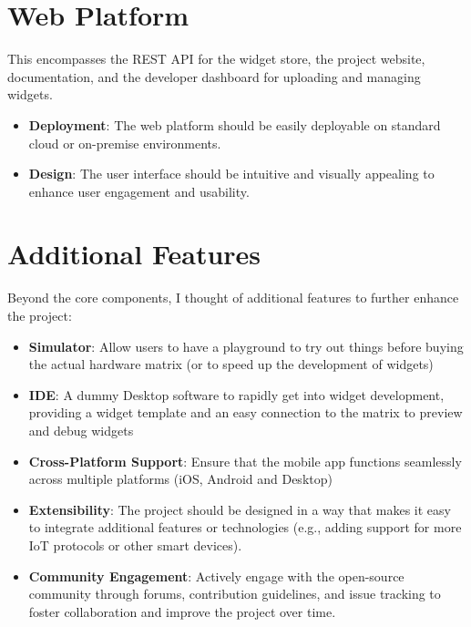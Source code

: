 \section{Web Platform}
This encompasses the REST API for the widget store,
the project website, documentation, and the developer dashboard for
uploading and managing widgets.

\begin{itemize}
    \item \textbf{Deployment}: The web platform should be easily deployable on
        standard cloud or on-premise environments.

    \item \textbf{Design}: The user interface should be intuitive and visually
        appealing to enhance user engagement and usability.
\end{itemize}


\section{Additional Features}
Beyond the core components, I thought of additional features to further enhance
the project:
\begin{itemize}
\item \textbf{Simulator}: Allow users to have a playground to try out things before buying the actual hardware matrix (or to speed up the development of widgets)

\item \textbf{IDE}: A dummy Desktop software to rapidly get into widget development, providing a widget template and an easy connection to the matrix to preview and debug widgets
  
	\item \textbf{Cross-Platform Support}: Ensure that the mobile app functions seamlessly
		across multiple platforms (iOS, Android and Desktop)

	\item \textbf{Extensibility}: The project should be designed in a way that makes
		it easy to integrate additional features or technologies (e.g., adding
		support for more IoT protocols or other smart devices).

	\item \textbf{Community Engagement}: Actively engage with the open-source community
		through forums, contribution guidelines, and issue tracking to foster collaboration
		and improve the project over time.
\end{itemize}